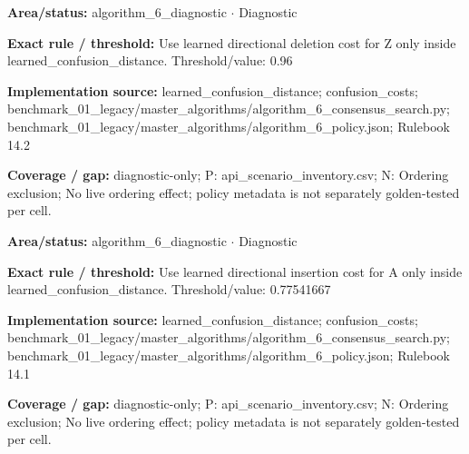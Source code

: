 \begin{tcolorbox}[enhanced,breakable,colback=white,colframe=Muted!45,boxrule=0.45pt,arc=1.5pt,left=6pt,right=6pt,top=5pt,bottom=5pt,title={\texttt{A6-LEARNED-DELETION-Z}},title after break={\texttt{A6-LEARNED-DELETION-Z}\ (continued)},fonttitle=\headingfont\bfseries\color{Navy},coltitle=Navy]
\textbf{Area/status:} algorithm\_\allowbreak{}6\_\allowbreak{}diagnostic $\boldsymbol{\cdot}$ Diagnostic\par
\smallskip
\textbf{Exact rule / threshold:} Use learned directional deletion cost for Z only inside learned\_\allowbreak{}confusion\_\allowbreak{}distance. Threshold/\allowbreak{}value: 0.96\par
\smallskip
\textbf{Implementation source:} learned\_\allowbreak{}confusion\_\allowbreak{}distance; confusion\_\allowbreak{}costs; benchmark\_\allowbreak{}01\_\allowbreak{}legacy/\allowbreak{}master\_\allowbreak{}algorithms/\allowbreak{}algorithm\_\allowbreak{}6\_\allowbreak{}consensus\_\allowbreak{}search.py; benchmark\_\allowbreak{}01\_\allowbreak{}legacy/\allowbreak{}master\_\allowbreak{}algorithms/\allowbreak{}algorithm\_\allowbreak{}6\_\allowbreak{}policy.json; Rulebook 14.2\par
\smallskip
\textbf{Coverage / gap:} diagnostic-only; P: api\_\allowbreak{}scenario\_\allowbreak{}inventory.csv; N: Ordering exclusion; No live ordering effect; policy metadata is not separately golden-tested per cell.
\end{tcolorbox}
\begin{tcolorbox}[enhanced,breakable,colback=white,colframe=Muted!45,boxrule=0.45pt,arc=1.5pt,left=6pt,right=6pt,top=5pt,bottom=5pt,title={\texttt{A6-LEARNED-INSERTION-A}},title after break={\texttt{A6-LEARNED-INSERTION-A}\ (continued)},fonttitle=\headingfont\bfseries\color{Navy},coltitle=Navy]
\textbf{Area/status:} algorithm\_\allowbreak{}6\_\allowbreak{}diagnostic $\boldsymbol{\cdot}$ Diagnostic\par
\smallskip
\textbf{Exact rule / threshold:} Use learned directional insertion cost for A only inside learned\_\allowbreak{}confusion\_\allowbreak{}distance. Threshold/\allowbreak{}value: 0.77541667\par
\smallskip
\textbf{Implementation source:} learned\_\allowbreak{}confusion\_\allowbreak{}distance; confusion\_\allowbreak{}costs; benchmark\_\allowbreak{}01\_\allowbreak{}legacy/\allowbreak{}master\_\allowbreak{}algorithms/\allowbreak{}algorithm\_\allowbreak{}6\_\allowbreak{}consensus\_\allowbreak{}search.py; benchmark\_\allowbreak{}01\_\allowbreak{}legacy/\allowbreak{}master\_\allowbreak{}algorithms/\allowbreak{}algorithm\_\allowbreak{}6\_\allowbreak{}policy.json; Rulebook 14.1\par
\smallskip
\textbf{Coverage / gap:} diagnostic-only; P: api\_\allowbreak{}scenario\_\allowbreak{}inventory.csv; N: Ordering exclusion; No live ordering effect; policy metadata is not separately golden-tested per cell.
\end{tcolorbox}
